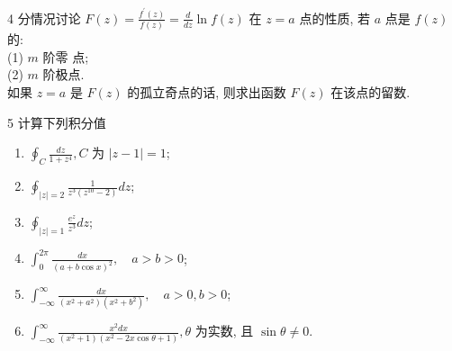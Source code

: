 \documentclass[11pt]{article}
\begin{document}
\vspace{0.5cm}


  
\begin{hwproblem}{4}
分情况讨论 $F(z)=\frac{f^{\prime}(z)}{f(z)}=\frac{d}{d z} \ln f(z)$ 在 $z=a$ 点的性质, 
  若 $a$ 点是 $f(z)$ 的: 
  \\
  (1) $m$ 阶零 点; 
  \\
  (2) $m$ 阶极点.
  \\
  如果 $z=a$ 是 $F(z)$ 的孤立奇点的话, 则求出函数 $F(z)$ 在该点的留数.
\end{hwproblem}

\vspace{0.5cm}


\begin{hwproblem}{5}
  计算下列积分值
  \begin{enumerate}
    \item $\oint_C \frac{d z}{1+z^4}, C$ 为 $|z-1|=1$;
    \item $\oint_{|z|=2} \frac{1}{z^3\left(z^{10}-2\right)} d z$;
    \item $\oint_{|z|=1} \frac{e^z}{z^3} d z$; 
    \item $\int_0^{2 \pi} \frac{d x}{(a+b \cos x)^2}, \quad a>b>0$;
    \item $\int_{-\infty}^{\infty} \frac{d x}{(x^2 + a^2)(x^2+b^2)}, \quad a>0, b>0$;
    \item $\int_{-\infty}^{\infty} \frac{x^2 d x}{\left(x^2+1\right)\left(x^2-2 x \cos \theta+1\right)}, \theta$ 为实数, 且 $\sin \theta \neq 0$.
  \end{enumerate}

\end{hwproblem}

\vspace{0.5cm}

\hwrequirements
\end{document}
